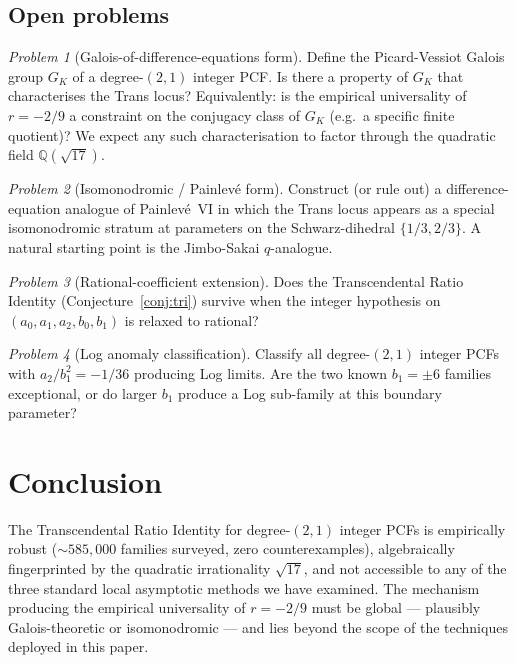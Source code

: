 \documentclass[11pt]{amsart}
\theoremstyle{definition}
\theoremstyle{remark}
\newtheorem{problem}{Problem}
\newcommand{\Q}{\mathbb{Q}}
\begin{document}
\subsection{Open problems}

\begin{problem}[Galois-of-difference-equations form]
\label{prob:galois}
Define the Picard-Vessiot Galois group $G_K$ of a degree-$(2,1)$
integer PCF.  Is there a property of $G_K$ that characterises the
Trans locus?  Equivalently: is the empirical universality of
$r=-2/9$ a constraint on the conjugacy class of $G_K$ (e.g.\ a
specific finite quotient)?  We expect any such characterisation to
factor through the quadratic field $\Q(\sqrt{17})$.
\end{problem}

\begin{problem}[Isomonodromic / Painlevé form]\label{prob:painleve}
Construct (or rule out) a difference-equation analogue of
Painlevé~VI in which the Trans locus appears as a special
isomonodromic stratum at parameters on the Schwarz-dihedral
$\{1/3,2/3\}$.  A natural starting point is the Jimbo-Sakai
$q$-analogue.
\end{problem}

\begin{problem}[Rational-coefficient extension]
\label{prob:rational}
Does the Transcendental Ratio Identity (Conjecture~\ref{conj:tri})
survive when the integer hypothesis on $(a_0,a_1,a_2,b_0,b_1)$ is
relaxed to rational?
\end{problem}

\begin{problem}[Log anomaly classification]\label{prob:log-anomaly}
Classify all degree-$(2,1)$ integer PCFs with $a_2/b_1^2 = -1/36$
producing Log limits.  Are the two known $b_1=\pm 6$ families
exceptional, or do larger $b_1$ produce a Log sub-family at this
boundary parameter?
\end{problem}

\section{Conclusion}\label{sec:conclusion}

The Transcendental Ratio Identity for degree-$(2,1)$ integer PCFs is
empirically robust ($\sim\!585{,}000$ families surveyed, zero
counterexamples), algebraically fingerprinted by the quadratic
irrationality $\sqrt{17}$, and not accessible to any of the three
standard local asymptotic methods we have examined.  The mechanism
producing the empirical universality of $r=-2/9$ must be global ---
plausibly Galois-theoretic or isomonodromic --- and lies beyond the
scope of the techniques deployed in this paper.
\end{document}
